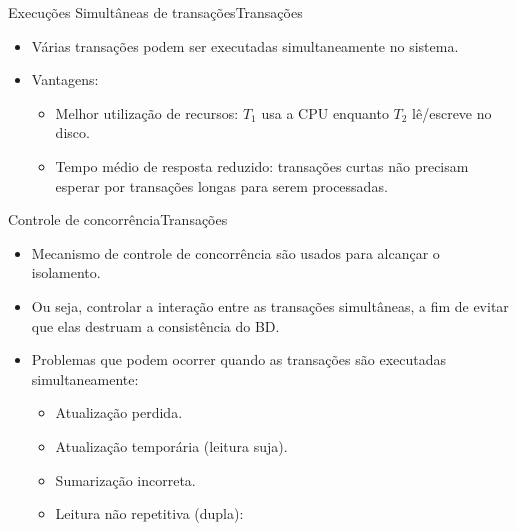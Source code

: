 \documentclass[t]{beamer}
\begin{document}
\begin{ftst}{Execuções Simultâneas de transações}{Transações}
\begin{itemize}
    \item Várias transações podem ser executadas simultaneamente no sistema.
    \item Vantagens:
    \begin{itemize}
        \item Melhor utilização de recursos: $T_1$ usa a CPU enquanto $T_2$ lê/escreve no disco.
        \item Tempo médio de resposta reduzido: transações curtas não precisam esperar por transações longas para serem processadas.
    \end{itemize}
\end{itemize}  
\end{ftst}


\begin{ftst}{Controle de concorrência}{Transações}
\begin{itemize}
    \item Mecanismo de controle de concorrência são usados para alcançar o isolamento.
    \item Ou seja, controlar a interação entre as transações simultâneas, a fim de evitar que elas destruam a consistência do BD.
    \item Problemas que podem ocorrer quando as transações são executadas simultaneamente:
    \begin{itemize}
        \item Atualização perdida.
        \item Atualização temporária (leitura suja).
        \item Sumarização incorreta.
        \item Leitura não repetitiva (dupla):
    \end{itemize}
\end{itemize}  
\end{ftst}

\end{document}
